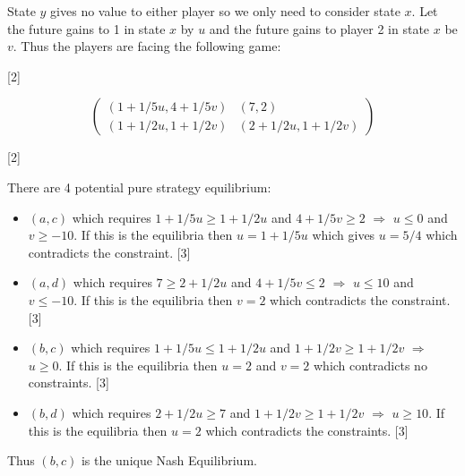 \documentclass[12pt,a4paper]{article}
\makeatletter
\renewcommand{\@oddfoot}{\hfil \arabic{page} \hfil}    %
\makeatother
\begin{document}
\begin{enumerate}
\begin{enumerate}
        State \(y\) gives no value to either player so we only need to consider state \(x\). Let the future gains to 1 in state \(x\) by \(u\) and the future gains to player 2 in state \(x\) be \(v\). Thus the players are facing the following game:

        \hfill[2]

        \[\begin{pmatrix}
        (1+1/5u,4+1/5v)&(7,2)\\
        (1+1/2u,1+1/2v)&(2+1/2u,1+1/2v)
        \end{pmatrix}\]

        \hfill[2]

        There are 4 potential pure strategy equilibrium:

        \begin{itemize}
            \item \((a,c)\) which requires \(1+1/5u\geq1+1/2u\) and \(4+1/5v\geq2\) \(\Rightarrow\) \(u\leq 0\) and \(v\geq -10\). If this is the equilibria then \(u=1+1/5u\) which gives \(u=5/4\) which contradicts the constraint.
            \hfill[3]
            \item \((a,d)\) which requires \(7\geq2+1/2u\) and \(4+1/5v\leq2\) \(\Rightarrow\) \(u\leq 10\) and \(v\leq -10\). If this is the equilibria then \(v=2\) which contradicts the constraint.
            \hfill[3]
            \item \((b,c)\) which requires \(1+1/5u\leq1+1/2u\) and \(1+1/2v\geq1+1/2v\) \(\Rightarrow\) \(u\geq 0\). If this is the equilibria then \(u=2\) and \(v=2\) which contradicts no constraints.
            \hfill[3]
            \item \((b,d)\) which requires \(2+1/2u\geq 7\) and \(1+1/2v\geq1+1/2v\) \(\Rightarrow\) \(u\geq 10\). If this is the equilibria then \(u=2\) which contradicts the constraints.
            \hfill[3]
        \end{itemize}

        Thus \((b,c)\) is the unique Nash Equilibrium.


    \end{enumerate}
\end{enumerate}


\makeatletter
\renewcommand{\@oddfoot}{\hfil \arabic{page}X \hfil}    %
\makeatother
\end{document}
